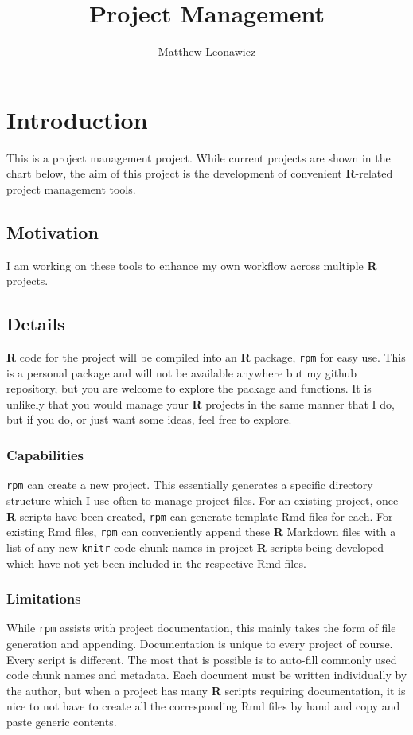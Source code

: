 \documentclass{article}\usepackage[]{graphicx}\usepackage[]{color}
\begin{document}
\title{Project Management}
\author{Matthew Leonawicz}
\maketitle






\section{Introduction}
This is a project management project.
While current projects are shown in the chart below, the aim of this project is the development of convenient \textbf{R}-related project management tools.

\subsection{Motivation}
I am working on these tools to enhance my own workflow across multiple \textbf{R} projects.

\subsection{Details}
\textbf{R} code for the project will be compiled into an \textbf{R} package, \texttt{rpm} for easy use.
This is a personal package and will not be available anywhere but my github repository,
but you are welcome to explore the package and functions.
It is unlikely that you would manage your \textbf{R} projects in the same manner that I do,
but if you do, or just want some ideas, feel free to explore.

\subsubsection{Capabilities}
\texttt{rpm} can create a new project. This essentially generates a specific directory structure which I use often to manage project files.
For an existing project, once \textbf{R} scripts have been created, \texttt{rpm} can generate template Rmd files for each.
For existing Rmd files, \texttt{rpm} can conveniently append these \textbf{R} Markdown files with a list of any new \texttt{knitr} code chunk names
in project \textbf{R} scripts being developed which have not yet been included in the respective Rmd files.

\subsubsection{Limitations}
While \texttt{rpm} assists with project documentation, this mainly takes the form of file generation and appending.
Documentation is unique to every project of course. Every script is different.
The most that is possible is to auto-fill commonly used code chunk names and metadata.
Each document must be written individually by the author, but when a project has many \textbf{R} scripts requiring documentation,
it is nice to not have to create all the corresponding Rmd files by hand and copy and paste generic contents.
\end{document}
